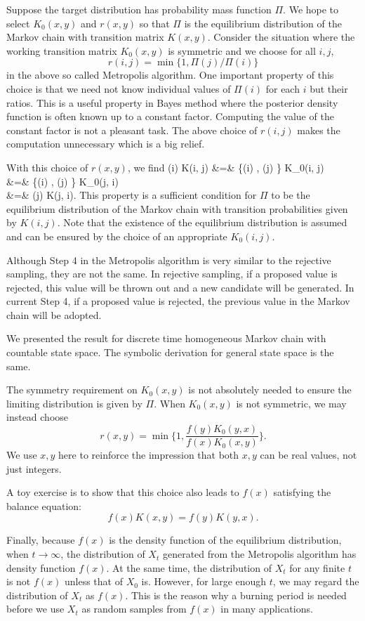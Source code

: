 Suppose the target distribution has probability mass function
$\Pi$. We hope to select $K_0(x, y)$ and $r(x, y)$ so that
$\Pi$ is the equilibrium distribution of the Markov chain
with transition matrix $K(x, y)$.
Consider the situation where the working transition matrix
$K_0(x, y)$ is symmetric and we choose for all $i, j$,
\[
r(i, j) = \min \{ 1 ,  \Pi(j)/\Pi(i) \}
\]
in the above so called Metropolis algorithm. One important
property of this choice is that we need not know individual
values of $\Pi(i)$ for each $i$ but their ratios. This is a useful
property in Bayes method where the posterior density function
is often known up to a constant factor. Computing the value
of the constant factor is not a pleasant task.
The above choice of $r(i, j)$ makes the computation unnecessary
which is a big relief.

With this choice of $r(x, y)$, we find
\bea
\Pi(i) K(i, j) 
&=&
 \min \{\Pi(i) , \Pi(j) \} K_0(i, j)\\
&=&
 \min \{\Pi(i) , \Pi(j) \} K_0(j, i)\\
&=&
\Pi(j) K(j, i).
\eea
This property is a sufficient condition for $\Pi$ to be the
equilibrium distribution of the Markov chain with
transition probabilities given by $K(i, j)$.
Note that the existence of the equilibrium distribution
is assumed and can be ensured by the choice
of an appropriate $K_0(i, j)$.

Although Step 4 in the Metropolis algorithm is very similar
to the rejective sampling, they are not the same.
In rejective sampling, if a proposed value is rejected,
this value will be thrown out and a new candidate will be
generated. In current Step 4, if a proposed value is rejected,
the previous value in the Markov chain will be adopted.

We presented the result for discrete time homogeneous 
Markov chain with countable state space. The symbolic derivation for
general state space is the same.

The symmetry requirement on $K_0(x, y)$ is not absolutely
needed to ensure the limiting distribution is given by $\Pi$.
When $K_0(x, y)$ is not symmetric, we may instead
choose
\[
r(x, y) 
= \min \big \{ 1, \frac{f(y) K_0(y, x)}{f(x)K_0(x, y)} \big \}.
\]
We use $x, y$ here to reinforce the impression that
both $x, y$ can be real values, not just integers.

A toy exercise is to show that this choice also
leads to $f(x)$ satisfying the balance equation:
\[
f(x) K(x, y) = f(y) K(y, x).
\]

Finally, because $f(x)$ is the density function of the
equilibrium distribution, when $t \to \infty$, the distribution
of $X_t$ generated from the Metropolis algorithm has density function
$f(x)$. At the same time, the distribution of $X_t$ for
any finite $t$ is not $f(x)$ unless that of $X_0$ is.
However, for large enough $t$, we may regard the distribution
of $X_t$ as $f(x)$. This is the reason why a burning
period is needed before we use $X_t$ as random samples
from $f(x)$ in many applications.

